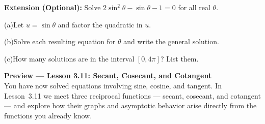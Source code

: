 \documentclass[10pt]{article}
\begin{document}
\vspace{0.08in}

\begin{extensionbox}
\textbf{Extension (Optional):} Solve $2\sin^2\theta - \sin\theta - 1 = 0$
for all real $\theta$.

\vspace{4pt}
(a)\quad Let $u = \sin\theta$ and factor the quadratic in $u$.

\vspace{6pt}
(b)\quad Solve each resulting equation for $\theta$ and write the general solution.

\vspace{6pt}
(c)\quad How many solutions are in the interval $[0, 4\pi]$? List them.
\end{extensionbox}

\vspace{0.08in}

\begin{tcolorbox}[colback=navylight, colframe=navy, arc=2mm,
    left=3mm, right=3mm, top=2mm, bottom=2mm]
\small\textbf{Preview --- Lesson 3.11: Secant, Cosecant, and Cotangent}\\
You have now solved equations involving sine, cosine, and tangent. In
Lesson~3.11 we meet three reciprocal functions --- secant, cosecant, and
cotangent --- and explore how their graphs and asymptotic behavior arise
directly from the functions you already know.
\end{tcolorbox}
\end{document}
